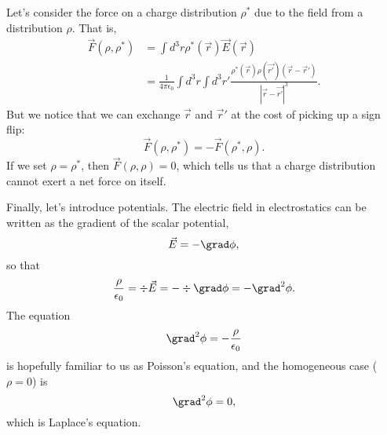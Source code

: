 Let's consider the force on a charge distribution $\rho^*$ due to the field from a distribution $\rho$. That is,
\begin{align}
    \vec{F}(\rho,\rho^*) &= \int d^3 r \rho^*(\vec r) \vec{E}(\vec{r})\\
        &= \frac{1}{4\pi \epsilon_0} \int d^3 r \int d^3 r' \frac{\rho^*(\vec{r}) \rho(\vec{r'}) (\vec r-\vec{r}')}{|\vec{r} - \vec{r'}|^3}.
\end{align}
But we notice that we can exchange $\vec{r}$ and $\vec{r}'$ at the cost of picking up a sign flip:
\begin{equation}
    \vec{F}(\rho,\rho^*) = -\vec{F}(\rho^*,\rho).
\end{equation}
If we set $\rho=\rho^*$, then $\vec{F}(\rho,\rho)=0$, which tells us that a charge distribution cannot exert a net force on itself.

Finally, let's introduce potentials. The electric field in electrostatics can be written as the gradient of the scalar potential,
\begin{equation}
    \vec{E} = -\grad \phi,
\end{equation}
so that
\begin{equation}
     \frac{\rho}{\epsilon_0} = \div \vec{E} = - \div \grad \phi = -\grad^2 \phi.
\end{equation}
The equation
\begin{equation}
    \grad^2 \phi = -\frac{\rho}{\epsilon_0}
\end{equation}
is hopefully familiar to us as Poisson's equation, and the homogeneous case ($\rho=0$) is
\begin{equation}
    \grad^2 \phi = 0,
\end{equation}
which is Laplace's equation.